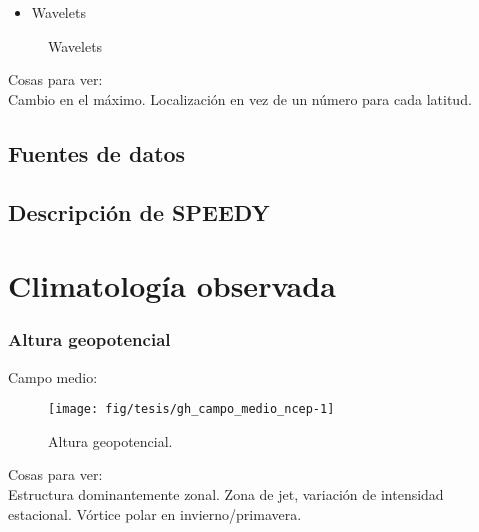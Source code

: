 \documentclass[spanish,a4paper]{book}
\providecommand{\tightlist}{%
  \setlength{\itemsep}{0pt}\setlength{\parskip}{0pt}}
\begin{document}
\begin{itemize}
\tightlist
\item
  Wavelets
\end{itemize}

\begin{figure*}
\caption{Wavelets}\label{fig:wavelet_ejemplo}
\end{figure*}

Cosas para ver:\\
Cambio en el máximo. Localización en vez de un número para cada latitud.

\section{Fuentes de datos}\label{fuentes-de-datos}

\section{Descripción de SPEEDY}\label{descripcion-de-speedy}

\chapter{Climatología observada}\label{climatologia-observada}

\subsection{Altura geopotencial}\label{altura-geopotencial}

Campo medio:

\begin{figure}

{\centering \texttt{[image: fig/tesis/gh\_campo\_medio\_ncep-1]} 

}

\caption{Altura geopotencial.}\label{fig:gh_campo_medio_ncep}
\end{figure}

Cosas para ver:\\
Estructura dominantemente zonal. Zona de jet, variación de intensidad
estacional. Vórtice polar en invierno/primavera.
\end{document}
